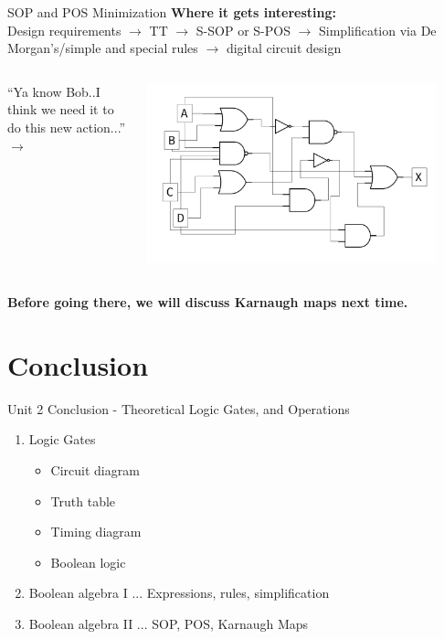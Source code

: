 \documentclass{beamer}
\begin{document}
\begin{frame}{SOP and POS Minimization}
\textbf{Where it gets interesting:} \\ \vspace{0.5cm}
Design requirements $\rightarrow$ TT $\rightarrow$ S-SOP or S-POS $\rightarrow$ Simplification via De Morgan's/simple and special rules $\rightarrow$ digital circuit design \\ \vspace{0.5cm}
\begin{columns}[T]
\small
\begin{column}{0.5\textwidth}
``Ya know Bob..I think we need it to do this new action...'' $\rightarrow$
\end{column}
\begin{column}{0.5\textwidth}
\includegraphics[width=0.9\textwidth]{figures/MultiGate2.pdf}
\end{column}
\end{columns}
\textbf{Before going there, we will discuss Karnaugh maps next time.}
\end{frame}

\section{Conclusion}

\begin{frame}{Unit 2 Conclusion - Theoretical Logic Gates, and Operations}
\begin{enumerate}
\item Logic Gates
\begin{itemize}
\item Circuit diagram
\item Truth table
\item Timing diagram
\item Boolean logic
\end{itemize}
\item \alert{Boolean algebra I} ... Expressions, rules, simplification
\item \alert{Boolean algebra II} ... SOP, POS, Karnaugh Maps
\end{enumerate}
\end{frame}
\end{document}
